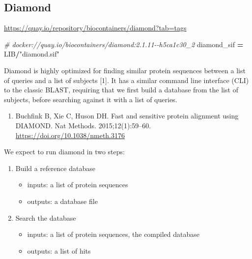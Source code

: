 \documentclass[
]{book}
\newenvironment{Shaded}{\begin{snugshade}}{\end{snugshade}}
\newcommand{\CommentTok}[1]{\textcolor[rgb]{0.56,0.35,0.01}{\textit{#1}}}
\newcommand{\NormalTok}[1]{#1}
\newcommand{\OperatorTok}[1]{\textcolor[rgb]{0.81,0.36,0.00}{\textbf{#1}}}
\newcommand{\StringTok}[1]{\textcolor[rgb]{0.31,0.60,0.02}{#1}}
\providecommand{\tightlist}{%
  \setlength{\itemsep}{0pt}\setlength{\parskip}{0pt}}
\begin{document}
\subsection{Diamond}\label{diamond}

\url{https://quay.io/repository/biocontainers/diamond?tab=tags}

\begin{Shaded}
\begin{Highlighting}[numbers=left,,]
\CommentTok{\# docker://quay.io/biocontainers/diamond:2.1.11{-}{-}h5ca1c30\_2}
\NormalTok{diamond\_sif }\OperatorTok{=}\NormalTok{ LIB}\OperatorTok{/}\StringTok{"diamond.sif"}
\end{Highlighting}
\end{Shaded}

Diamond is highly optimized for finding similar protein sequences between a list of queries and a list of subjects {[}1{]}.
It has a similar command line interface (CLI) to the classic BLAST, requiring that we first build a database from the list of subjects,
before searching against it with a list of queries.

\begin{enumerate}
\def\labelenumi{\arabic{enumi}.}
\tightlist
\item
  Buchfink B, Xie C, Huson DH. Fast and sensitive protein alignment using DIAMOND. Nat Methods. 2015;12(1):59--60. \url{https://doi.org/10.1038/nmeth.3176}
\end{enumerate}

We expect to run diamond in two steps:

\begin{enumerate}
\def\labelenumi{\arabic{enumi}.}
\tightlist
\item
  Build a reference database

  \begin{itemize}
  \tightlist
  \item
    inputs: a list of protein sequences
  \item
    outputs: a database file
  \end{itemize}
\item
  Search the database

  \begin{itemize}
  \tightlist
  \item
    inputs: a list of protein sequences, the compiled database
  \item
    outputs: a list of hits
  \end{itemize}
\end{enumerate}
\end{document}
